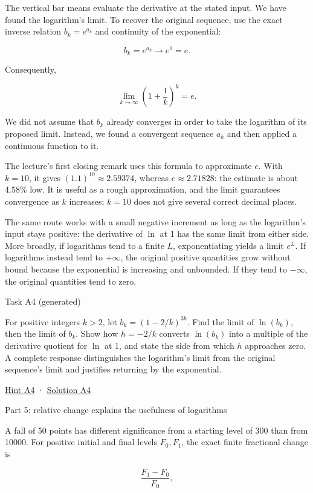 \documentclass[
  11pt,
]{article}
\providecommand{\gt}{>}
\begin{document}
The vertical bar means evaluate the derivative at the stated input. We
have found the logarithm's limit. To recover the original sequence, use
the exact inverse relation \(b_k=e^{a_k}\) and continuity of the
exponential:

\[
b_k=e^{a_k}\longrightarrow e^1=e.
\]

Consequently,

\[
\lim_{k\to\infty}\left(1+\frac1k\right)^k=e.
\]

We did not assume that \(b_k\) already converges in order to take the
logarithm of its proposed limit. Instead, we found a convergent sequence
\(a_k\) and then applied a continuous function to it.

The lecture's first closing remark uses this formula to approximate
\(e\). With \(k=10\), it gives \((1.1)^{10}\approx2.59374\), whereas
\(e\approx2.71828\): the estimate is about 4.58\% low. It is useful as a
rough approximation, and the limit guarantees convergence as \(k\)
increases; \(k=10\) does not give several correct decimal places.

The same route works with a small negative increment as long as the
logarithm's input stays positive: the derivative of \(\ln\) at 1 has the
same limit from either side. More broadly, if logarithms tend to a
finite \(L\), exponentiating yields a limit \(e^L\). If logarithms
instead tend to \(+\infty\), the original positive quantities grow
without bound because the exponential is increasing and unbounded. If
they tend to \(-\infty\), the original quantities tend to zero.

Task A4 (generated)

For positive integers \(k\gt 2\), let \(b_k=(1-2/k)^{3k}\). Find the
limit of \(\ln(b_k)\), then the limit of \(b_k\). Show how \(h=-2/k\)
converts \(\ln(b_k)\) into a multiple of the derivative quotient for
\(\ln\) at 1, and state the side from which \(h\) approaches zero. A
complete response distinguishes the logarithm's limit from the original
sequence's limit and justifies returning by the exponential.

\protect\hyperlink{hint-a4}{Hint A4} ·
\protect\hyperlink{solution-a4}{Solution A4}

Part 5: relative change explains the usefulness of logarithms

A fall of 50 points has different significance from a starting level of
300 than from 10000. For positive initial and final levels \(F_0,F_1\),
the exact finite fractional change is

\[
\frac{F_1-F_0}{F_0},
\]
\end{document}
